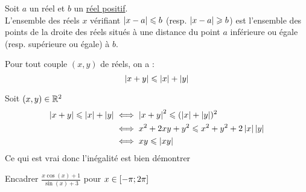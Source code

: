 \begin{defprop}
	Soit \(a\) un réel et \(b\) un \underline{réel positif}. \\
	L’ensemble des réels \(x\) vérifiant \(\left\lvert x-a\right\rvert\leqslant b\) (resp. \(\left\lvert x-a\right\rvert\geqslant b \)) est l’ensemble des points de la droite des
	réels situés à une distance du point \(a\) inférieure ou égale (resp. supérieure ou égale) à \(b\).
\end{defprop}

\begin{prop}
	Pour tout couple \((x,y)\) de réels, on a :
	\[\left\lvert x+y\right\rvert\leqslant \left\lvert x\right\rvert+\left\lvert y\right\rvert\]
\end{prop}

\begin{dem} 
	Soit \((x,y) \in \mathbb{R}^2\)
	\begin{align*}
		\left\lvert x+y\right\rvert\leqslant \left\lvert x\right\rvert+\left\lvert y\right\rvert & \iff \left\lvert x+y\right\rvert^2\leqslant (\left\lvert x\right\rvert+\left\lvert y\right\rvert)^2 \\
        &\iff x^2+2xy+y^2 \leqslant x^2+y^2+2\left\lvert x\right\rvert\left\lvert y\right\rvert \\
        &\iff xy\leqslant \left\lvert xy\right\rvert
	\end{align*}
    Ce qui est vrai donc l'inégalité est bien démontrer 
\end{dem}

\begin{exoex}
    Encadrer \(\frac{x\cos(x)+1}{\sin(x)+3}\) pour \(x\in\left[-\pi;2\pi\right]\)
\end{exoex}

